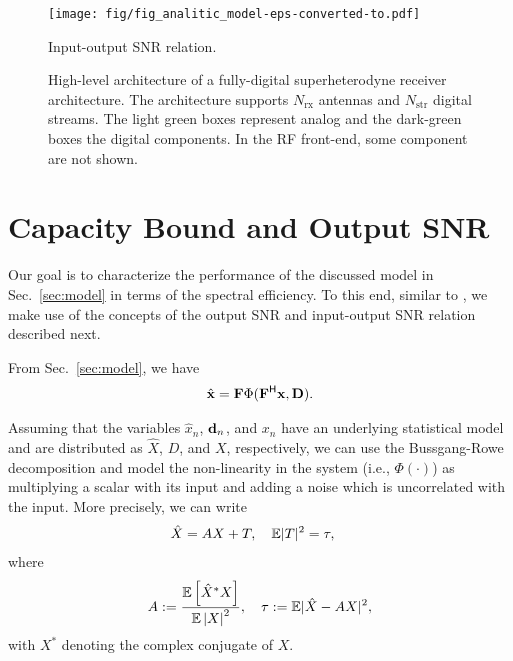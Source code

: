 \begin{figure}[t]
    \centering
    \texttt{[image: fig/fig\_analitic\_model-eps-converted-to.pdf]}
    \caption{Input-output SNR relation.}
    \label{fig:snr_inout}
\end{figure}

\begin{figure*}[!t]
    \centering
    
    \caption{High-level architecture of a fully-digital superheterodyne 
    receiver architecture. The architecture supports $N_\mathrm{rx}$ antennas and
    $N_\mathrm{str}$ digital streams. The light green boxes represent analog and the 
    dark-green boxes the digital components. In the RF front-end, 
    some component are not shown.}
    \label{fig:arch}
\end{figure*}

\section{Capacity Bound and Output SNR}
\label{sect:capacity}
Our goal is to characterize the performance of the discussed model in Sec.~\ref{sec:model} in terms of the spectral efficiency. To this end, similar to \cite{skrimponis2020efficient}, we make use of the concepts of the output SNR and input-output SNR relation described next. 

From Sec.~\ref{sec:model}, we have 
\begin{align}
    \label{eq:inoutre}
    \hat{{\mathbf{x}}} = {\mathbf{F}}\Phi({\mathbf{F}} ^{\text{\sf H}} {\mathbf{x}}, {\mathbf{D}}).
\end{align}

Assuming that the variables $\hat{x}_n$, ${\mathbf{d}}_n$, and $x_n$ have an underlying statistical model and are distributed as $\hat{X}$, $D$, and $X$, respectively, we can use the Bussgang-Rowe decomposition \cite{bussgang1952crosscorrelation,rowe1982memoryless} and model the non-linearity in the system (i.e., $\Phi(\cdot)$) as multiplying a scalar with its input and adding a noise which is uncorrelated with the input. More precisely, we can write
\begin{align}
\label{eq:lin_mod}
    \hat{X} = A X+ T,\quad \mathbb{E} |T|^2 &= \tau,
\end{align}
where
\begin{align}
\label{eq:alpha_tau_rx}
    A := \frac{\mathbb{E}\left[ \hat{X}^* X\right]}{\mathbb{E}\left|X\right|^2 }, \quad \tau :=  \mathbb{E}|\hat{X}- A X|^2,
\end{align} 
with $X^*$ denoting the complex conjugate of $X$.

